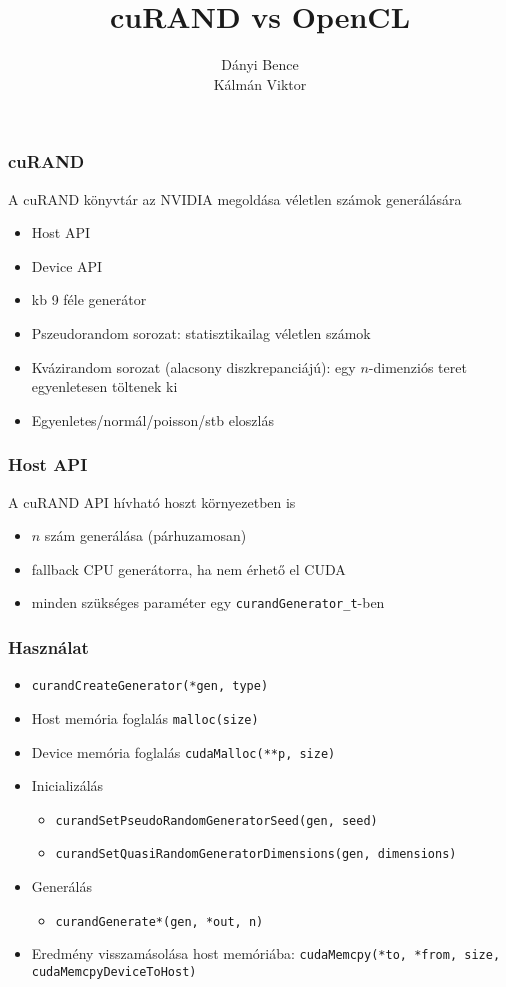 \documentclass[xetex]{beamer}
\title{cuRAND vs OpenCL}
\author{Dányi Bence\\ Kálmán Viktor}
\begin{document}
  \frame{\titlepage}
  \begin{frame}
    \frametitle{cuRAND}
    A cuRAND könyvtár az NVIDIA megoldása véletlen számok generálására
    \begin{itemize}
      \item Host API
      \item Device API
      \item kb 9 féle generátor
      \item Pszeudorandom sorozat: statisztikailag véletlen számok
      \item Kvázirandom sorozat (alacsony diszkrepanciájú): egy $n$-dimenziós teret egyenletesen töltenek ki
      \item Egyenletes/normál/poisson/stb eloszlás
    \end{itemize}
  \end{frame}
  \begin{frame}
    \frametitle{Host API}
    A cuRAND API hívható hoszt környezetben is
    \begin{itemize}
      \item $n$ szám generálása (párhuzamosan)
      \item fallback CPU generátorra, ha nem érhető el CUDA
      \item minden szükséges paraméter egy \texttt{curandGenerator\_t}-ben
    \end{itemize}
  \end{frame}
  \begin{frame}
    \frametitle{Használat}
    \begin{itemize}
      \item \texttt{curandCreateGenerator(*gen, type)}
      \item Host memória foglalás \texttt{malloc(size)}
      \item Device memória foglalás \texttt{cudaMalloc(**p, size)}
      \item Inicializálás
        \begin{itemize}
          \item \texttt{curandSetPseudoRandomGeneratorSeed(gen, seed)}
          \item \texttt{curandSetQuasiRandomGeneratorDimensions(gen, dimensions)}
        \end{itemize}
      \item Generálás
      \begin{itemize}
        \item \texttt{curandGenerate*(gen, *out, n)}
      \end{itemize}
      \item Eredmény visszamásolása host memóriába: \texttt{cudaMemcpy(*to, *from, size, cudaMemcpyDeviceToHost)}
    \end{itemize}
  \end{frame}
\end{document}
